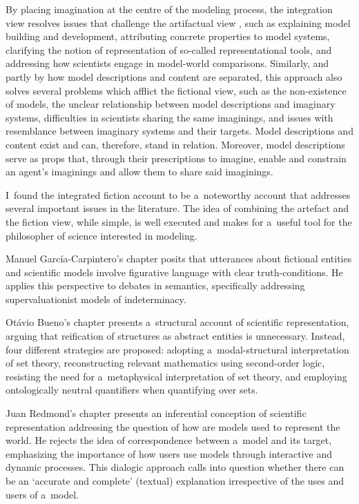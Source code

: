 By placing imagination at the centre of the modeling process, the integration view resolves issues that challenge the artifactual view
\parencite*[][p.173]{}, %
 such as explaining model building and development, attributing concrete properties to model systems, clarifying the notion of representation of so-called representational tools, and addressing how scientists engage in model-world comparisons. Similarly, and partly by how model descriptions and content are separated, this approach also solves several problems which afflict the fictional view, such as the non-existence of models, the unclear relationship between model descriptions and imaginary systems, difficulties in scientists sharing the same imaginings, and issues with resemblance between imaginary systems and their targets. Model descriptions and content exist and can, therefore, stand in relation. Moreover, model descriptions serve as props that, through their prescriptions to imagine, enable and constrain an agent's imaginings and allow them to share said imaginings.

I~found the integrated fiction account to be a~noteworthy account that addresses several important issues in the literature. The idea of combining the artefact and the fiction view, while simple, is well executed and makes for a~useful tool for the philosopher of science interested in modeling.

Manuel García-Carpintero's chapter posits that utterances about fictional entities and scientific models involve figurative language with clear truth-conditions. He applies this perspective to debates in semantics, specifically addressing supervaluationist models of indeterminacy.

Otávio Bueno's chapter presents a~structural account of scientific representation, arguing that reification of structures as abstract entities is unnecessary. Instead, four different strategies are proposed: adopting a~modal-structural interpretation of set theory, reconstructing relevant mathematics using second-order logic, resisting the need for a~metaphysical interpretation of set theory, and employing ontologically neutral quantifiers when quantifying over sets.

Juan Redmond's chapter presents an inferential conception of scientific representation addressing the question of how are models used to represent the world. He rejects the idea of correspondence between a~model and its target, emphasizing the importance of how users use models through interactive and dynamic processes. This dialogic approach calls into question whether there can be an ‘accurate and complete' (textual) explanation irrespective of the uses and users of a~model.


